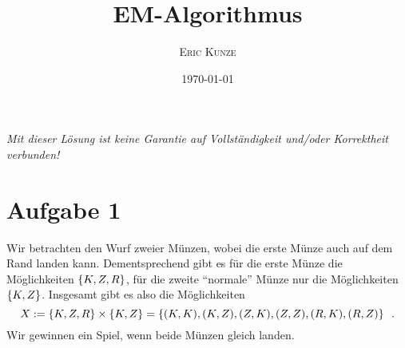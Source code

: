 \documentclass[ngerman, a4paper, 12pt]{article}
\newcommand{\satzende}{\enskip \text{.}}
\begin{document}
	\title{\bfseries \sffamily \huge EM-Algorithmus}
	\author{\scshape Eric Kunze}
	\date{\today}
	\maketitle
	{ \footnotesize \doclicenseThis }
	
	\begin{center}
		\small \slshape Mit dieser Lösung ist keine Garantie auf Vollständigkeit und/oder Korrektheit verbunden!
	\end{center}
	
	\section*{Aufgabe 1}
	Wir betrachten den Wurf zweier Münzen, wobei die erste Münze auch auf dem Rand landen kann. Dementsprechend gibt es für die erste Münze die Möglichkeiten $\left\{ K,Z,R \right\}$, für die zweite \enquote{normale} Münze nur die Möglichkeiten $\left\{ K,Z \right\}$. Insgesamt gibt es also die Möglichkeiten
	\begin{equation*}
	X \defeq \menge{K,Z,R} \times \menge{K,Z} = \menge{(K,K), (K,Z), (Z,K), (Z,Z), (R,K), (R,Z)} \satzende
	\end{equation*}
	Wir gewinnen ein Spiel, wenn beide Münzen gleich landen.
	
\end{document}

